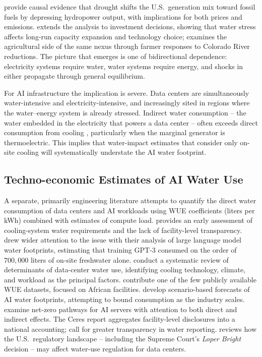 \documentclass[11pt, letterpaper]{article}
\begin{document}
\citet{eyer2018does} provide causal evidence that drought shifts the U.S.\ generation mix toward fossil fuels by depressing hydropower output, with implications for both prices and emissions. \citet{harris2024drought} extends the analysis to investment decisions, showing that water stress affects long-run capacity expansion and technology choice; \citet{harris2024farmer} examines the agricultural side of the same nexus through farmer responses to Colorado River reductions. The picture that emerges is one of bidirectional dependence: electricity systems require water, water systems require energy, and shocks in either propagate through general equilibrium.

For AI infrastructure the implication is severe. Data centers are simultaneously water-intensive and electricity-intensive, and increasingly sited in regions where the water--energy system is already stressed. Indirect water consumption -- the water embedded in the electricity that powers a data center -- often exceeds direct consumption from cooling \citep{jin2019water,EESIWater2025}, particularly when the marginal generator is thermoelectric. This implies that water-impact estimates that consider only on-site cooling will systematically understate the AI water footprint.

\subsection{Techno-economic Estimates of AI Water Use}

A separate, primarily engineering literature attempts to quantify the direct water consumption of data centers and AI workloads using WUE coefficients (liters per kWh) combined with estimates of compute load. \citet{mytton2021data} provides an early assessment of cooling-system water requirements and the lack of facility-level transparency. \citet{li2023making} drew wider attention to the issue with their analysis of large language model water footprints, estimating that training GPT-3 consumed on the order of $700{,}000$ liters of on-site freshwater alone. \citet{lei2025water} conduct a systematic review of determinants of data-center water use, identifying cooling technology, climate, and workload as the principal factors. \citet{shumba2025water} contribute one of the few publicly available WUE datasets, focused on African facilities. \citet{herrera2025sustainable} develop scenario-based forecasts of AI water footprints, attempting to bound consumption as the industry scales. \citet{xiao2025environmental} examine net-zero pathways for AI servers with attention to both direct and indirect effects. The Ceres report \citep{ceres_drained_by_data_2025} aggregates facility-level disclosures into a national accounting; \citet{privette2025data} call for greater transparency in water reporting. \citet{garcia2024ai} reviews how the U.S.\ regulatory landscape -- including the Supreme Court's \emph{Loper Bright} decision -- may affect water-use regulation for data centers.
\end{document}
